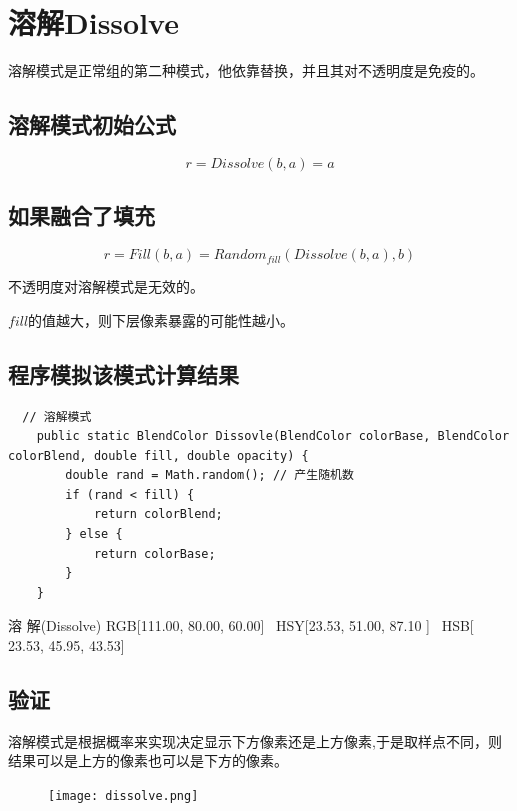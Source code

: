 \section{ 溶解Dissolve}
溶解模式是正常组的第二种模式，他依靠替换，并且其对不透明度是免疫的。
\subsection{ 溶解模式初始公式}
\begin{equation}r=Dissolve(b,a)=a\end{equation}
\subsection{ 如果融合了填充}
\begin{equation}r=Fill(b,a)= Random_{fill}(Dissolve(b,a),b)\end{equation}
\begin{notice}
\item 不透明度对溶解模式是无效的。
\item $fill$的值越大，则下层像素暴露的可能性越小。
\end{notice}


\subsection{ 程序模拟该模式计算结果}

\begin{lstlisting}	// 溶解模式
	public static BlendColor Dissovle(BlendColor colorBase, BlendColor colorBlend, double fill, double opacity) {
		double rand = Math.random(); // 产生随机数
		if (rand < fill) {
			return colorBlend;
		} else {
			return colorBase;
		}
	}
\end{lstlisting}
\begin{result}
\item 	溶    解(Dissolve)      RGB[111.00,  80.00,  60.00]~ HSY[23.53,  51.00,  87.10 ]~ HSB[ 23.53,  45.95,  43.53]
\end{result}

\newpage
\subsection{ 验证}
\begin{notice}
	\item 溶解模式是根据概率来实现决定显示下方像素还是上方像素,于是取样点不同，则结果可以是上方的像素也可以是下方的像素。
	\end{notice}
\begin{figure}[!h]
	\centering
	\texttt{[image: dissolve.png]}
\end{figure}

